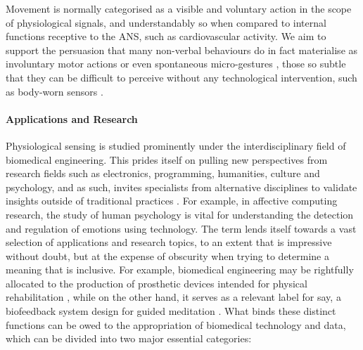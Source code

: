 Movement is normally categorised as a visible and voluntary action in the scope of physiological signals, and understandably so when compared to internal functions receptive to the ANS, such as cardiovascular activity. We aim to support the persuasion that many non-verbal behaviours do in fact materialise as involuntary motor actions \cite{haueisen_involuntary_2001} or even spontaneous micro-gestures \cite{chen_analyze_2019}, those so subtle that they can be difficult to perceive without any technological intervention, such as body-worn sensors \cite{jensenius_exploring_2017}.




\paragraph{Applications and Research}

Physiological sensing is studied prominently under the interdisciplinary field of biomedical engineering. This prides itself on pulling new perspectives from research fields such as electronics, programming, humanities, culture and psychology, and as such, invites specialists from alternative disciplines to validate insights outside of traditional practices \cite{enderle_introduction_2012}. For example, in affective computing research, the study of human psychology is vital for understanding the detection and regulation of emotions using technology. The term lends itself towards a vast selection of applications and research topics, to an extent that is impressive without doubt, but at the expense of obscurity when trying to determine a meaning that is inclusive. For example, biomedical engineering may be rightfully allocated to the production of prosthetic devices intended for physical rehabilitation \cite{valentinuzzi_physical_2019}, while on the other hand, it serves as a relevant label for say, a biofeedback system design for guided meditation \cite{foo_soft_2020}. What binds these distinct functions can be owed to the appropriation of biomedical technology and data, which can be divided into two major essential categories: 

